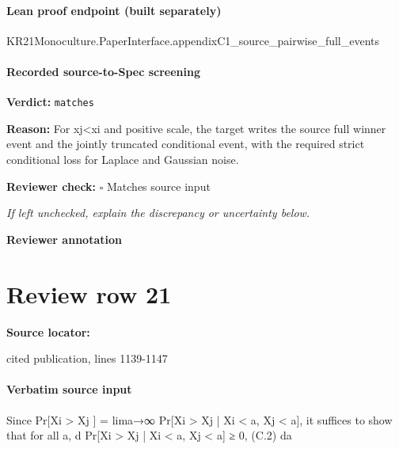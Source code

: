 \documentclass[10pt]{article}
\newcommand{\reviewerbox}{%
  \par\noindent\fbox{\parbox{0.96\linewidth}{\rule{0pt}{0.38in}}}\par
}
\newcommand{\reviewmatch}[1]{%
  \par\noindent\textbf{Reviewer check:} $\square$\; #1\par
  \noindent\emph{If left unchecked, explain the discrepancy or uncertainty below.}\par
}
\begin{document}
\paragraph{Lean proof endpoint (built separately)}\begin{ReviewVerbatim}
KR21Monoculture.PaperInterface.appendixC1_source_pairwise_full_events
\end{ReviewVerbatim}

\paragraph{Recorded source-to-Spec screening}
\textbf{Verdict:} \texttt{matches}
\\
{\raggedright
\textbf{Reason:} For xj<xi and positive scale, the target writes the source full winner event and the jointly truncated conditional event, with the required strict conditional loss for Laplace and Gaussian noise.\allowbreak{}
\par}
\reviewmatch{Matches source input}
\noindent\textbf{Reviewer annotation}\par
\reviewerbox
\clearpage
\hypertarget{source-claim-6a2a92d325b21a46}{}
\section*{Review row 21}
\textbf{Source locator:} {\footnotesize\raggedright cited publication, lines 1139-\allowbreak{}1147\par}
\paragraph{Verbatim source input}
\begin{ReviewVerbatim}
Since Pr[Xi > Xj ] = lima→∞ Pr[Xi > Xj | Xi < a, Xj < a], it suffices to show that for all a,
d
Pr[Xi > Xj | Xi < a, Xj < a] ≥ 0,
(C.2)
da
\end{ReviewVerbatim}
\end{document}
